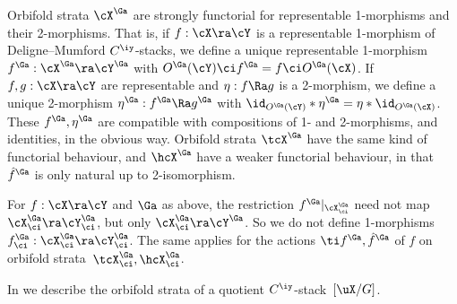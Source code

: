 \documentclass{article}
\begin{document}
Orbifold strata $\cX^\Ga$ are strongly functorial for representable
1-morphisms and their 2-morphisms. That is, if $f:\cX\ra\cY$ is a
representable 1-morphism of Deligne--Mumford $C^\iy$-stacks, we
define a unique representable 1-morphism $f^\Ga:\cX^\Ga\ra\cY^\Ga$
with $O^\Ga(\cY)\ci f^\Ga=f\ci O^\Ga(\cX)$. If $f,g:\cX\ra\cY$ are
representable and $\eta:f\Ra g$ is a 2-morphism, we define a unique
2-morphism $\eta^\Ga:f^\Ga\Ra g^\Ga$ with $\id_{O^\Ga(\cY)}*
\eta^\Ga=\eta*\id_{O^\Ga(\cX)}$. These $f^\Ga,\eta^\Ga$ are
compatible with compositions of 1- and 2-morphisms, and identities,
in the obvious way. Orbifold strata $\tcX^\Ga$ have the same kind of
functorial behaviour, and $\hcX^\Ga$ have a weaker functorial
behaviour, in that $\hat f{}^\Ga$ is only natural up to
2-isomorphism.

For $f:\cX\ra\cY$ and $\Ga$ as above, the restriction
$f^\Ga\vert_{\smash{\cX^\Ga_\ci}}$ need not map
$\cX^\Ga_\ci\ra\cY^\Ga_\ci$, but only $\cX^\Ga_\ci\ra\cY^\Ga$. So we
do not define 1-morphisms $f^\Ga_\ci:\cX^\Ga_\ci\ra\cY^\Ga_\ci$. The
same applies for the actions $\ti f{}^\Ga,\hat f{}^\Ga$ of $f$ on
orbifold strata~$\tcX^\Ga_\ci,\hcX^\Ga_\ci$.

In \cite[\S 11.3]{Joyc4} we describe the orbifold strata of a
quotient $C^\iy$-stack~$[\uX/G]$.
\end{document}
